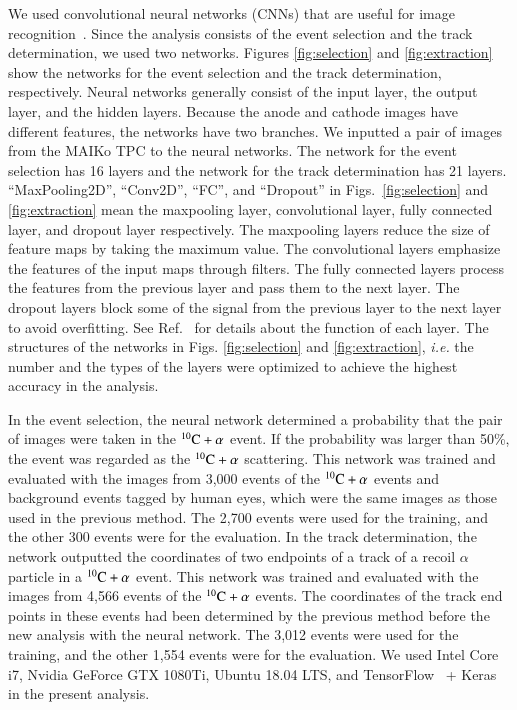 \documentclass{jps-cp}
\begin{document}
We used convolutional neural networks (CNNs) that are useful for image recognition~\cite{lenet,alexnet}.
Since the analysis consists of the event selection and the track determination,
we used two networks.
Figures \ref{fig:selection} and \ref{fig:extraction} show
the networks for the event selection and the track determination, respectively.
Neural networks generally consist of the input layer, the output layer, and the hidden layers.
Because the anode and cathode images have different features,
the networks have two branches.
We inputted a pair of images from the MAIKo TPC to the neural networks.
The network for the event selection has 16 layers and the network for the track determination has 21 layers.
``MaxPooling2D'', ``Conv2D'', ``FC'', and ``Dropout'' in Figs.~\ref{fig:selection} and \ref{fig:extraction}
mean the maxpooling layer, convolutional layer, fully connected layer, and dropout layer respectively.
The maxpooling layers reduce the size of feature maps by taking the maximum value.
The convolutional layers emphasize the features of the input maps through filters.
The fully connected layers process the features from the previous layer and pass them to the next layer.
The dropout layers block some of the signal from the previous layer to the next layer to avoid overfitting.
See Ref.~\cite{conv,dropout} for details about the function of each layer.
The structures of the networks in Figs. \ref{fig:selection} and \ref{fig:extraction}, {\it i.e.}
the number and the types of the layers were
optimized to achieve the highest accuracy in the analysis.

In the event selection, the neural network determined a probability that the pair of images were taken
in the ${}^{10}\rm{C}+\alpha$ event.
If the probability was larger than 50\%, the event was regarded as the ${}^{10}\rm{C}+\alpha$ scattering.
This network was trained and evaluated with the images from 3,000 events of the ${}^{10}{\rm C}+\alpha$
events and background events tagged by human eyes,
which were the same images as those used in the previous method.
The 2,700 events were used for the training, and the other 300 events were for the evaluation.
In the track determination, the network outputted the coordinates of two endpoints of
a track of a recoil $\alpha$ particle in a ${}^{10}\rm{C}+\alpha$ event.
This network was trained and evaluated with the images from 4,566 events of the ${}^{10}\rm{C}+\alpha$ events.
The coordinates of the track end points in these events had been determined by the previous method
before the new analysis with the neural network.
The 3,012 events were used for the training, and the other 1,554 events were for the evaluation.
We used Intel Core i7, Nvidia GeForce GTX 1080Ti, Ubuntu 18.04 LTS, and
TensorFlow~\cite{tensorflow} + Keras~\cite{keras} in the present analysis.
\end{document}
